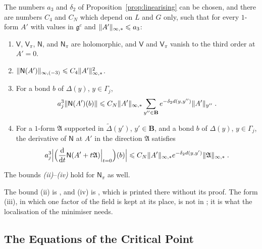 \documentclass[11pt]{preprint}
\newcommand{\dd}{\mathrm{d}}
\DeclarePairedDelimiter{\norm}{\lVert}{\rVert}
\numberwithin{equation}{section}
\begin{document}
\begin{proposition}\label{prop:potential}
The numbers $a_3$ and $\delta_2$ of Proposition~\ref{prop:linearising} can be chosen, and there are numbers $C_4$ and $C_N$ which depend on $L$ and $G$ only, such that for every $1$-form $A'$ with values in $\mathfrak g^c$ and $\norm{A'}_{\infty,*} \leqslant a_3$:
\begin{enumerate}[label=(\roman*)]
\item $\mathsf V$, $\mathsf V_\pi$, $\mathsf N$, and $\mathsf N_\pi$ are holomorphic, and $\mathsf V$ and $\mathsf V_\pi$ vanish to the third order at $A' = 0$.
\item $\norm{\mathsf N(A')}_{\infty,(-3)} \leqslant C_4\norm{A'}_{\infty,*}^2$.
\item For a bond $b$ of $\Delta(y)$, $y \in \Gamma_j$,
\begin{equation}\label{eq:gradient-kernel}
    a_j^3\norm{\mathsf N(A')(b)} \leqslant C_N\norm{A'}_{\infty,*}\sum_{y'' \in \mathbf B}e^{-\delta_2d(y, y'')}\norm{A'}_{y''}\;.
\end{equation}
\item For a $1$-form $\mathfrak A$ supported in $\tilde\Delta(y')$, $y' \in \mathbf B$, and a bond $b$ of $\Delta(y)$, $y \in \Gamma_j$, the derivative of $\mathsf N$ at $A'$ in the direction $\mathfrak A$ satisfies
\begin{equation}\label{eq:gradient-derivative}
    a_j^3\Bigl\lvert\Bigl(\frac{\dd}{\dd t}\mathsf N(A' + t\mathfrak A)\Big|_{t=0}\Bigr)(b)\Bigr\rvert \leqslant C_N\norm{A'}_{\infty,*}e^{-\delta_2d(y, y')}\norm{\mathfrak A}_{\infty,*}\;.
\end{equation}
\end{enumerate}
The bounds \emph{(ii)}--\emph{(iv)} hold for $\mathsf N_\pi$ as well.
\end{proposition}

The bound (ii) is \cite[Proposition~4, p.~292]{BalabanVAR}, and (iv) is \cite[(189), p.~308]{BalabanVAR}, which is printed there without its proof. The form (iii), in which one factor of the field is kept at its place, is not in \cite{BalabanVAR}; it is what the localisation of the minimiser needs.

\subsection{The Equations of the Critical Point}\label{sec:critical-point}
\end{document}
